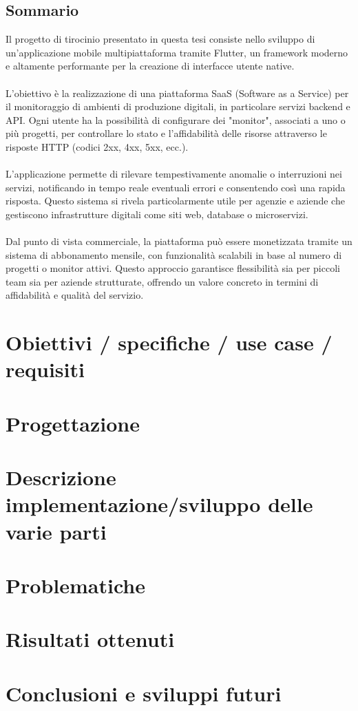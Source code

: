 \documentclass[12pt]{article}
\begin{document}
\begin{center}
\subsection*{Sommario}
\end{center}
Il progetto di tirocinio presentato in questa tesi consiste nello sviluppo di un’applicazione mobile multipiattaforma tramite Flutter, un framework moderno e altamente performante per la creazione di interfacce utente native.
\\\\ L'obiettivo è la realizzazione di una piattaforma SaaS (Software as a Service) per il monitoraggio di ambienti di produzione digitali, in particolare servizi backend e API. Ogni utente ha la possibilità di configurare dei "monitor", associati a uno o più progetti, per controllare lo stato e l'affidabilità delle risorse attraverso le risposte HTTP (codici 2xx, 4xx, 5xx, ecc.).
\\\\L'applicazione permette di rilevare tempestivamente anomalie o interruzioni nei servizi, notificando in tempo reale eventuali errori e consentendo così una rapida risposta. Questo sistema si rivela particolarmente utile per agenzie e aziende che gestiscono infrastrutture digitali come siti web, database o microservizi.
\\\\Dal punto di vista commerciale, la piattaforma può essere monetizzata tramite un sistema di abbonamento mensile, con funzionalità scalabili in base al numero di progetti o monitor attivi. Questo approccio garantisce flessibilità sia per piccoli team sia per aziende strutturate, offrendo un valore concreto in termini di affidabilità e qualità del servizio.

\newpage

\tableofcontents

\newpage


\newpage
\section{\textbf{Obiettivi / specifiche / use case / requisiti}}
\newpage
\section{\textbf{Progettazione}}
\newpage
\section{\textbf{Descrizione implementazione/sviluppo delle varie parti}}
\newpage
\section{\textbf{Problematiche}}
\newpage
\section{\textbf{Risultati ottenuti}}
\newpage
\section{\textbf{Conclusioni e sviluppi futuri}}
\end{document}
